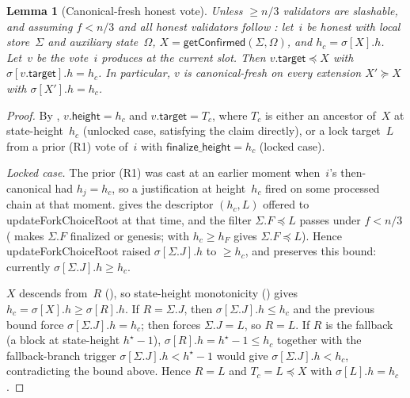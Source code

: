 \documentclass{article}
\newcommand{\target}{\mathsf{target}}
\newcommand{\height}{\mathsf{height}}
\newcommand{\finalizeHeight}{\mathsf{finalize\_height}}
\newcommand{\updateForkChoiceRoot}{\textsf{updateForkChoiceRoot}\xspace}
\newcommand{\getConfirmed}{\textsf{getConfirmed}\xspace}
\theoremstyle{plain}
\newtheorem{lemma}{Lemma}
\theoremstyle{definition}
\theoremstyle{remark}
\begin{document}
\begin{lemma}[Canonical-fresh honest vote]\label{lem:canonical-fresh-honest-vote}
Unless $\geq n/3$ validators are slashable, and assuming $f < n/3$ and all honest validators follow : let~$i$ be honest with local store~$\Sigma$ and auxiliary state~$\Omega$, $X = \getConfirmed(\Sigma, \Omega)$, and $h_c = \sigma[X].h$.
Let~$v$ be the vote~$i$ produces at the current slot.
Then $v.\target \preceq X$ with $\sigma[v.\target].h = h_c$.
In particular, $v$ is canonical-fresh on every extension $X' \succeq X$ with $\sigma[X'].h = h_c$.
\end{lemma}

\begin{proof}
By , $v.\height = h_c$ and $v.\target = T_c$, where $T_c$ is either an ancestor of~$X$ at state-height~$h_c$ (unlocked case, satisfying the claim directly), or a lock target~$L$ from a prior (R1) vote of~$i$ with $\finalizeHeight = h_c$ (locked case).

\emph{Locked case.}
The prior (R1) was cast at an earlier moment when~$i$'s then-canonical had $h_j = h_c$, so a justification at height~$h_c$ fired on some processed chain at that moment.
 gives the descriptor $(h_c, L)$ offered to \updateForkChoiceRoot at that time, and the filter $\Sigma.F \preceq L$ passes under $f < n/3$ ( makes $\Sigma.F$ finalized or genesis;  with $h_c \geq h_{F}$ gives $\Sigma.F \preceq L$).
Hence \updateForkChoiceRoot raised $\sigma[\Sigma.J].h$ to $\geq h_c$, and  preserves this bound: currently $\sigma[\Sigma.J].h \geq h_c$.

$X$ descends from~$R$ (), so state-height monotonicity () gives $h_c = \sigma[X].h \geq \sigma[R].h$.
If $R = \Sigma.J$, then $\sigma[\Sigma.J].h \leq h_c$ and the previous bound force $\sigma[\Sigma.J].h = h_c$;  then forces $\Sigma.J = L$, so $R = L$.
If $R$ is the fallback (a block at state-height $h^\star - 1$), $\sigma[R].h = h^\star - 1 \leq h_c$ together with the fallback-branch trigger $\sigma[\Sigma.J].h < h^\star - 1$ would give $\sigma[\Sigma.J].h < h_c$, contradicting the bound above.
Hence $R = L$ and $T_c = L \preceq X$ with $\sigma[L].h = h_c$.
\end{proof}
\end{document}
